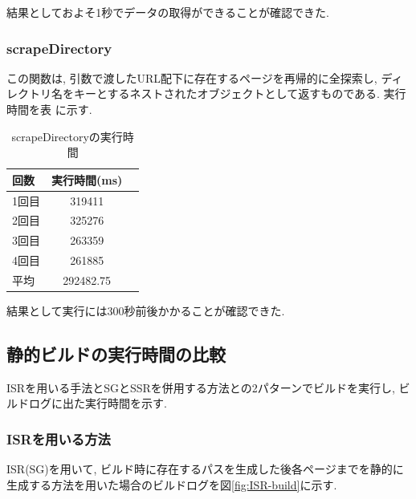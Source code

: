結果としておよそ1秒でデータの取得ができることが確認できた.

\subsubsection{scrapeDirectory}
この関数は, 引数で渡したURL配下に存在するページを再帰的に全探索し, ディレクトリ名をキーとするネストされたオブジェクトとして返すものである.
実行時間を表 に示す.

\begin{table}[hbtp]
	\caption{scrapeDirectoryの実行時間}
	\label{table:data_type}
	\centering
	\begin{tabular}{lcr}
		\hline
		回数  & 実行時間(ms)   \\
		\hline \hline
		1回目 & 319411     \\
		2回目 & 325276     \\
		3回目 & 263359     \\
		4回目 & 261885     \\
		\hline
		平均  & 292482.75
	\end{tabular}
\end{table}

結果として実行には300秒前後かかることが確認できた.

\subsection{静的ビルドの実行時間の比較}
ISRを用いる手法とSGとSSRを併用する方法との2パターンでビルドを実行し, ビルドログに出た実行時間を示す.
\subsubsection{ISRを用いる方法}
ISR(SG)を用いて, ビルド時に存在するパスを生成した後各ページまでを静的に生成する方法を用いた場合のビルドログを図\ref{fig:ISR-build}に示す.

